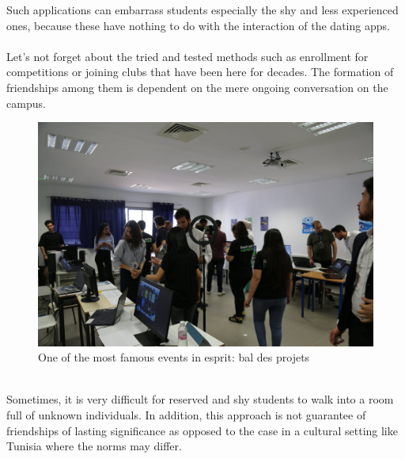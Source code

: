 Such applications can embarrass students especially the shy and less experienced ones, because these have nothing to do with the interaction of the dating apps.
\\
\\
Let's not forget about the tried and tested methods such as enrollment for competitions or joining clubs that have been here for decades. The formation of friendships among them is dependent on the mere ongoing conversation on the campus.
\begin{figure}[H] 
            \centering
            \includegraphics[scale=0.15]{event.jpg}
            \caption{One of the most famous events in esprit: bal des projets} 
            \label{fig: Student events exemple}
\end{figure}

\\

Sometimes, it is very difficult for reserved and shy students to walk into a room full of unknown individuals. In addition, this approach is not guarantee of friendships of lasting significance as opposed to the case in a cultural setting like Tunisia where the norms may differ.
\\

